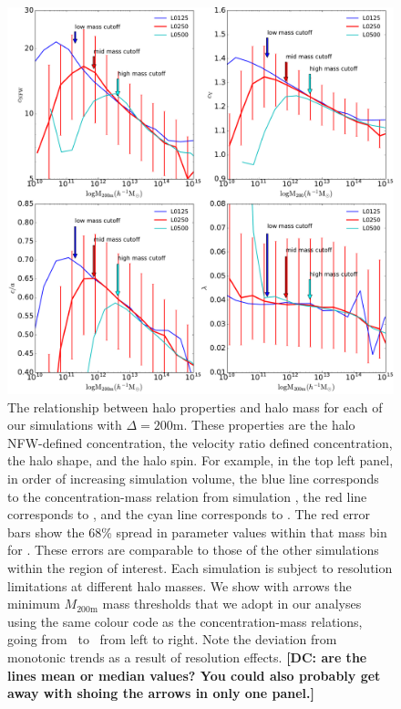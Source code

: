 \documentclass[usenatbib,fleqn]{mnras}
\begin{document}
\begin{figure}
\centering
\includegraphics[width=\textwidth]{masscuts_d200.pdf}
\caption{
The relationship between halo properties and halo mass for each of our simulations with $\Delta =200$m. These properties are the halo NFW-defined concentration, the velocity ratio defined concentration, the halo shape, and the halo spin. For example, in the top left panel, in order of increasing simulation volume, the blue line corresponds to the concentration-mass relation from simulation \simA, the red line corresponds to \simB, and the cyan line corresponds to \simC. The red error bars show the 68\% spread in parameter values within that mass bin for \simB. These errors are comparable to those of the other simulations within the region of interest. Each simulation is subject to resolution limitations at different halo masses. We show with arrows the minimum $M_{200\text{m}}$ mass thresholds that we adopt in our analyses using the same colour code as the concentration-mass relations, going from \simA \ to \simC \ from left to right. Note the deviation from monotonic trends as a result of resolution effects. {\bf [DC: are the lines mean or median values?  You could also probably get away with shoing the arrows in only one panel.]}
}
\label{fig:massrelation}
\end{figure}
\end{document}
